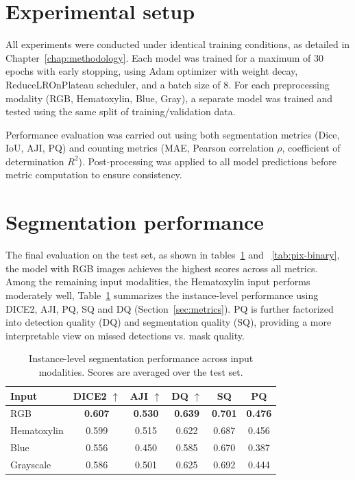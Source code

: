\documentclass[target=bach,aauheader=,style=]{thud}
\begin{document}
\section{Experimental setup}
All experiments were conducted under identical training conditions, as detailed in Chapter~\ref{chap:methodology}. 
Each model was trained for a maximum of 30 epochs with early stopping, using Adam optimizer with weight decay, ReduceLROnPlateau scheduler, and a batch size of 8. 
For each preprocessing modality (RGB, Hematoxylin, Blue, Gray), a separate model was trained and tested using the same split of training/validation data.

Performance evaluation was carried out using both segmentation metrics (Dice, IoU, AJI, PQ) and counting metrics (MAE, Pearson correlation $\rho$, coefficient of determination $R^2$). 
Post-processing was applied to all model predictions before metric computation to ensure consistency.

\section{Segmentation performance}

The final evaluation on the test set, as shown in tables~\ref{tab:iou-results} and ~\ref{tab:pix-binary}, the model with RGB images achieves the highest scores across all metrics.\\
Among the remaining input modalities, the Hematoxylin input performs moderately well,  
Table~\ref{tab:iou-results}  summarizes the instance-level performance using DICE2, AJI, PQ, SQ and DQ (Section~\ref{sec:metrics}). 
PQ is further factorized into detection quality (DQ) and segmentation quality (SQ), providing a more interpretable view on missed detections vs. mask quality.

\begin{table}[ht]
\centering
\caption{Instance-level segmentation performance across input modalities. Scores are averaged over the test set.}
\label{tab:iou-results}
\small
\begin{tabular}{lccccc}
\toprule
\textbf{Input} & \textbf{DICE2} $\uparrow$ & \textbf{AJI} $\uparrow$ & \textbf{DQ} $\uparrow$ & \textbf{SQ} & \textbf{PQ}\\
\midrule
RGB         & \textbf{0.607} & \textbf{0.530} & \textbf{0.639} & \textbf{0.701} & \textbf{0.476}\\
Hematoxylin & 0.599 & 0.515 & 0.622 & 0.687 & 0.456\\
Blue        & 0.556 & 0.450 & 0.585 & 0.670 & 0.387\\
Grayscale   & 0.586 & 0.501 & 0.625 & 0.692 & 0.444\\
\bottomrule
\end{tabular}
\end{table}
\end{document}
